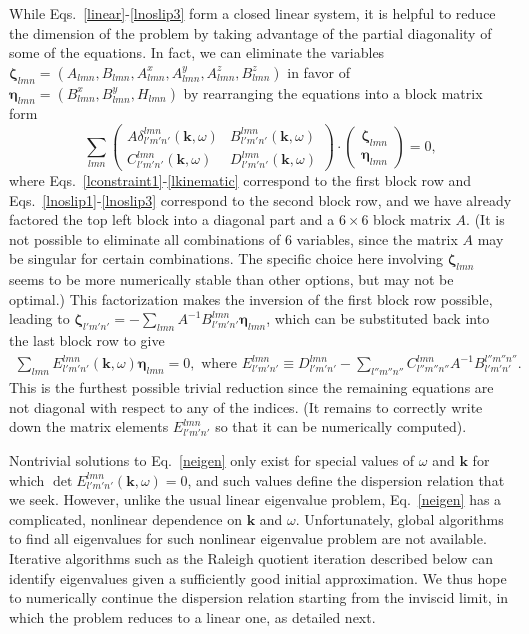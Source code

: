 \documentclass[aps,pre,amsmath,amssymb,floatfix,onecolumn,notitlepage,10pt]{revtex4-1}
\begin{document}
While Eqs.~\eqref{linear}-\eqref{lnoslip3} form a closed linear system, it is helpful to reduce the dimension of the problem by taking advantage of the partial diagonality of some of the equations.  In fact, we can eliminate the variables $\bm{\zeta}_{lmn}=(A_{lmn},B_{lmn},A^x_{lmn},A^y_{lmn},A^z_{lmn},B^z_{lmn})$ in favor of $\bm{\eta}_{lmn}=(B^x_{lmn},B^y_{lmn},H_{lmn})$ by rearranging the equations into a block matrix form
\begin{equation}
\sum_{lmn} \begin{pmatrix} A\delta^{lmn}_{l'm'n'}(\mathbf{k},\omega) & B^{lmn}_{l'm'n'}(\mathbf{k},\omega) \\ C^{lmn}_{l'm'n'}(\mathbf{k},\omega) & D^{lmn}_{l'm'n'}(\mathbf{k},\omega) \end{pmatrix} \cdot \begin{pmatrix} \bm{\zeta}_{lmn} \\ \bm{\eta}_{lmn}\end{pmatrix} = 0,
\end{equation}
where Eqs.~\eqref{lconstraint1}-\eqref{lkinematic} correspond to the first block row and Eqs.~\eqref{lnoslip1}-\eqref{lnoslip3} correspond to the second block row, and we have already factored the top left block into a diagonal part and a $6\times 6$ block matrix $A$.  (It is not possible to eliminate all combinations of $6$ variables, since the matrix $A$ may be singular for certain combinations. The specific choice here involving $\bm{\zeta}_{lmn}$ seems to be more numerically stable than other options, but may not be optimal.) This factorization makes the inversion of the first block row possible, leading to $\bm{\zeta}_{l'm'n'} =- \sum_{lmn} A^{-1} B^{lmn}_{l'm'n'}\bm{\eta}_{lmn}$, which can be substituted back into the last block row to give
\begin{align}
\sum_{lmn} E_{l'm'n'}^{lmn}(\mathbf{k},\omega) \bm{\eta}_{lmn} = 0, \text{ where } E_{l'm'n'}^{lmn} \equiv D^{lmn}_{l'm'n'} - \sum_{l''m''n''} C^{lmn}_{l''m''n''}A^{-1}B^{l''m''n''}_{l'm'n'}. \label{neigen}
\end{align}
This is the furthest possible trivial reduction since the remaining equations are not diagonal with respect to any of the indices. (It remains to correctly write down the matrix elements $E^{lmn}_{l'm'n'}$ so that it can be numerically computed).

Nontrivial solutions to Eq.~\eqref{neigen} only exist for special values of $\omega$ and $\mathbf{k}$ for which $\det E_{l'm'n'}^{lmn}(\mathbf{k},\omega)=0$, and such values define the dispersion relation that we seek. However, unlike the usual linear eigenvalue problem, Eq.~\eqref{neigen} has a complicated, nonlinear dependence on $\mathbf{k}$ and $\omega$. Unfortunately, global algorithms to find all eigenvalues for such nonlinear eigenvalue problem are not available. Iterative algorithms such as the Raleigh quotient iteration described below can identify eigenvalues given a sufficiently good initial approximation. We thus hope to numerically continue the dispersion relation starting from the inviscid limit, in which the problem reduces to a linear one, as detailed next.
\end{document}
